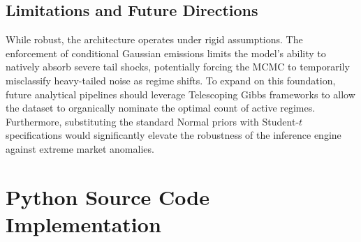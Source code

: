 \documentclass[12pt, a4paper]{article}
\begin{document}
\subsection{Limitations and Future Directions}
While robust, the architecture operates under rigid assumptions. The enforcement of conditional Gaussian emissions limits the model's ability to natively absorb severe tail shocks, potentially forcing the MCMC to temporarily misclassify heavy-tailed noise as regime shifts. To expand on this foundation, future analytical pipelines should leverage Telescoping Gibbs frameworks \citep{fruhwirth2023} to allow the dataset to organically nominate the optimal count of active regimes. Furthermore, substituting the standard Normal priors with Student-$t$ specifications would significantly elevate the robustness of the inference engine against extreme market anomalies.

\newpage
\appendix
\section{Python Source Code Implementation}
\end{document}

